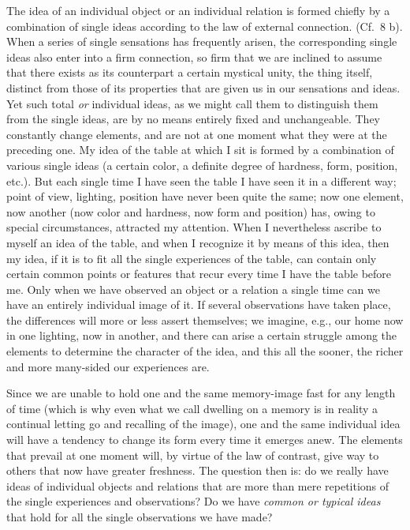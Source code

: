 \documentclass[12pt,a4paper]{book}
\newcommand{\opage}[1]{\marginnote{\footnotesize\textit{[#1]}}}
\begin{document}
\opage{200}The idea of an individual object or an individual relation is
formed chiefly by a combination of single ideas according to the law of
external connection. (Cf.\ 8 b). When a series of single sensations has
frequently arisen, the corresponding single ideas also enter into a firm
connection, so firm that we are inclined to assume that there exists as
its counterpart a certain mystical unity, the thing itself, distinct
from those of its properties that are given us in our sensations and
ideas. Yet such total \emph{or} individual ideas, as we might call them
to distinguish them from the single ideas, are by no means entirely
fixed and unchangeable. They constantly change elements, and are not at
one moment what they were at the preceding one. My idea of the table at
which I sit is formed by a combination of various single ideas (a
certain color, a definite degree of hardness, form, position, etc.). But
each single time I have seen the table I have seen it in a different
way; point of view, lighting, position have never been quite the same;
now one element, now another (now color and hardness, now form and
position) has, owing to special circumstances, attracted my attention.
When I nevertheless ascribe to myself an idea of the table, and when I
recognize it by means of this idea, then my idea, if it is to fit all
the single experiences of the table, can contain only certain common
points or features that recur every time I have the table before me.
Only when we have observed an object or a relation a single time can we
have an entirely individual image of it. If several observations have
taken place, the differences will more or less assert themselves; we
imagine, e.g., our home now in one lighting, now in another, and there
can arise a certain struggle among the elements to determine the
character of the idea, and this all the sooner, the richer and more
many-sided our experiences are.

Since we are unable to hold one and the same memory-image fast for any
length of time (which is why even what we call dwelling on a memory is
in reality a continual letting go and recalling of the image), one and
the same individual idea
\opage{201}will have a tendency to change its form every time it emerges
anew. The elements that prevail at one moment will, by virtue of the law
of contrast, give way to others that now have greater freshness. The
question then is: do we really have ideas of individual objects and
relations that are more than mere repetitions of the single experiences
and observations? Do we have \emph{common or typical ideas} that hold
for all the single observations we have made?
\end{document}
